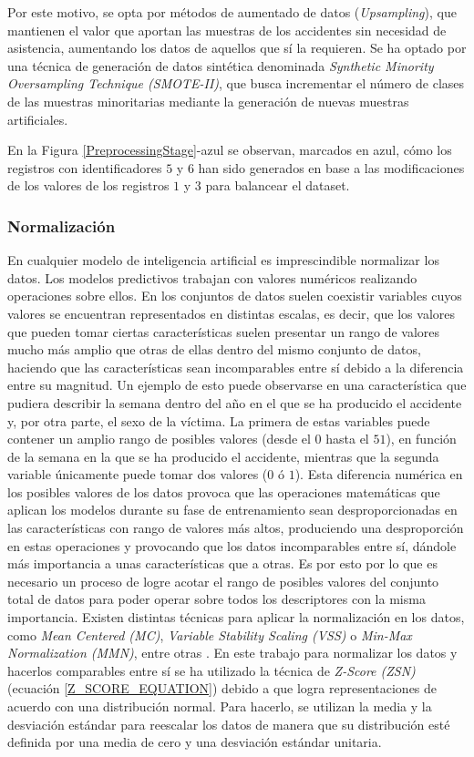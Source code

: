 Por este motivo, se opta por métodos de aumentado de datos (\textit{Upsampling}), que mantienen el valor que aportan las muestras de los accidentes sin necesidad de asistencia, aumentando los datos de aquellos que sí la requieren. Se ha optado por una técnica de generación de datos sintética denominada \textit{Synthetic Minority Oversampling Technique (SMOTE-II)}, que busca incrementar el número de clases de las muestras minoritarias mediante la generación de nuevas muestras artificiales.

En la Figura \ref{PreprocessingStage}-azul se observan, marcados en azul, cómo los registros con identificadores $5$ y $6$ han sido generados en base a las modificaciones de los valores de los registros $1$ y $3$ para balancear el dataset.



\subsubsection{Normalización}

En cualquier modelo de inteligencia artificial es imprescindible normalizar los datos. Los modelos predictivos trabajan con valores numéricos realizando operaciones sobre ellos. En los conjuntos de datos suelen coexistir variables cuyos valores se encuentran representados en distintas escalas, es decir, que los valores que pueden tomar ciertas características suelen presentar un rango de valores mucho más amplio que otras de ellas dentro del mismo conjunto de datos, haciendo que las características sean incomparables entre sí debido a la diferencia entre su magnitud. Un ejemplo de esto puede observarse en una característica que pudiera describir la semana dentro del año en el que se ha producido el accidente y, por otra parte, el sexo de la víctima. La primera de estas variables puede contener un amplio rango de posibles valores (desde el $0$ hasta el $51$), en función de la semana en la que se ha producido el accidente, mientras que la segunda variable únicamente puede tomar dos valores ($0$ ó $1$). Esta diferencia numérica en los posibles valores de los datos provoca que las operaciones matemáticas que aplican los modelos durante su fase de entrenamiento sean desproporcionadas en las características con rango de valores más altos, produciendo una desproporción en estas operaciones y provocando que los datos incomparables entre sí, dándole más importancia a unas características que a otras. Es por esto por lo que es necesario un proceso de logre acotar el rango de posibles valores del conjunto total de datos para poder operar sobre todos los descriptores con la misma importancia. Existen distintas técnicas para aplicar la normalización en los datos, como \textit{Mean Centered (MC)}, \textit{Variable Stability Scaling (VSS)} o \textit{Min-Max Normalization (MMN)}, entre otras \cite{DataNormalizationInvestigation}. En este trabajo para normalizar los datos y hacerlos comparables entre sí se ha utilizado la técnica de \textit{Z-Score (ZSN)} (ecuación \ref{Z_SCORE_EQUATION}) debido a que logra representaciones de acuerdo con una distribución normal. Para hacerlo, se utilizan la media y la desviación estándar para reescalar los datos de manera que su distribución esté definida por una media de cero y una desviación estándar unitaria.

